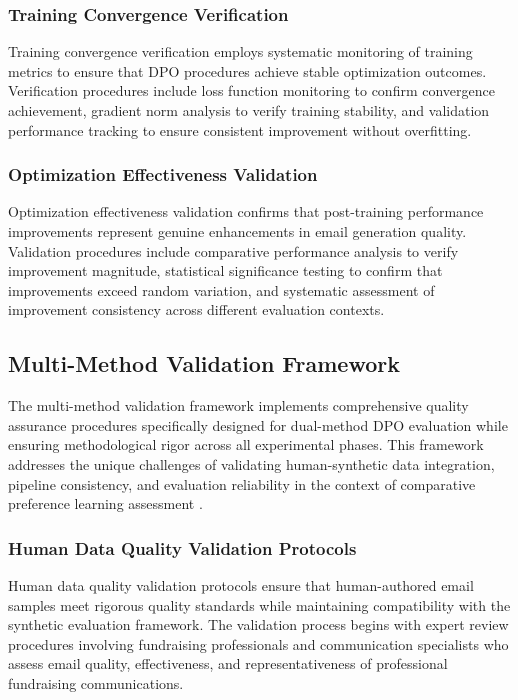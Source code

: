 \subsubsection{Training Convergence Verification}

Training convergence verification employs systematic monitoring of training metrics to ensure that DPO procedures achieve stable optimization outcomes. Verification procedures include loss function monitoring to confirm convergence achievement, gradient norm analysis to verify training stability, and validation performance tracking to ensure consistent improvement without overfitting.

\subsubsection{Optimization Effectiveness Validation}

Optimization effectiveness validation confirms that post-training performance improvements represent genuine enhancements in email generation quality. Validation procedures include comparative performance analysis to verify improvement magnitude, statistical significance testing to confirm that improvements exceed random variation, and systematic assessment of improvement consistency across different evaluation contexts.

\subsection{Multi-Method Validation Framework}
\label{sec:multi-method-validation}

The multi-method validation framework implements comprehensive quality assurance procedures specifically designed for dual-method DPO evaluation while ensuring methodological rigor across all experimental phases. This framework addresses the unique challenges of validating human-synthetic data integration, pipeline consistency, and evaluation reliability in the context of comparative preference learning assessment \cite{chen2024reproducibility_hci, yin2024reproducibility_ml}.

\subsubsection{Human Data Quality Validation Protocols}

Human data quality validation protocols ensure that human-authored email samples meet rigorous quality standards while maintaining compatibility with the synthetic evaluation framework. The validation process begins with expert review procedures involving fundraising professionals and communication specialists who assess email quality, effectiveness, and representativeness of professional fundraising communications.

